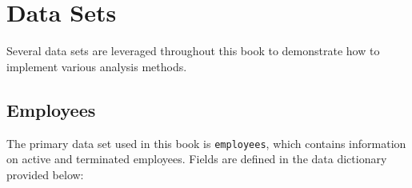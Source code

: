 \documentclass[
]{book}
\begin{document}
\hypertarget{data-sets}{%
\section{Data Sets}\label{data-sets}}

Several data sets are leveraged throughout this book to demonstrate how to implement various analysis methods.

\hypertarget{employees}{%
\subsection{Employees}\label{employees}}

The primary data set used in this book is \texttt{employees}, which contains information on active and terminated employees. Fields are defined in the data dictionary provided below:
\end{document}

